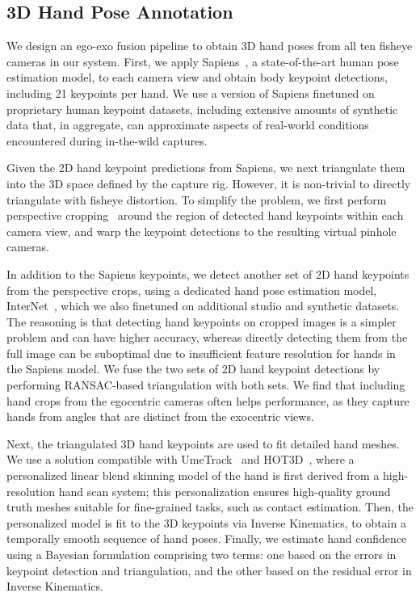 \documentclass[10pt,twocolumn,letterpaper]{article}
\begin{document}
\subsection{3D Hand Pose Annotation}
\label{sec:hand_pose}
We design an ego-exo fusion pipeline to obtain 3D hand poses from all ten  fisheye cameras in our system.
First, we apply Sapiens~\cite{khirodkar2024sapiens}, a state-of-the-art human pose  estimation model, to each camera view and obtain body keypoint detections, including 21 keypoints per hand. 
We use a version of Sapiens finetuned on proprietary human keypoint datasets, including extensive amounts of synthetic data that, in aggregate, can approximate aspects of real-world conditions encountered during in-the-wild captures.

Given the 2D hand keypoint predictions from Sapiens, we next triangulate them into the 3D space defined by the capture rig.
However, it is non-trivial to directly triangulate with fisheye distortion.
To simplify the problem, we first perform perspective cropping~\cite{han2022umetrack} around the region of detected hand keypoints within each camera view, and warp the keypoint detections to the resulting virtual pinhole cameras.


In addition to the Sapiens keypoints, we detect another set of 2D hand keypoints from the perspective crops, using a dedicated hand pose estimation model, InterNet~\cite{Moon_2020_ECCV_InterHand2.6M}, which we also finetuned on additional studio and synthetic datasets.
The reasoning is that detecting hand keypoints on cropped images is a simpler problem and can have higher accuracy, whereas directly detecting them from the full image can be suboptimal due to insufficient feature resolution for hands in the Sapiens model.
We fuse the two sets of 2D hand keypoint detections by performing RANSAC-based triangulation with both sets.
We find that including hand crops from the egocentric cameras often helps performance, as they capture hands from angles that are distinct from the exocentric views.


Next, the triangulated 3D hand keypoints are used to fit detailed hand meshes. 
We use a solution compatible with UmeTrack~\cite{han2022umetrack} and HOT3D~\cite{banerjee2025hot3d}, where a personalized linear blend skinning model of the hand is first derived from a high-resolution hand scan system;
this personalization ensures high-quality ground truth meshes suitable for fine-grained tasks, such as contact estimation.
Then, the personalized model is fit to the 3D keypoints via Inverse Kinematics, to obtain a temporally smooth sequence of hand poses.
Finally, we estimate hand confidence using a Bayesian formulation comprising two terms: one based on the errors in keypoint detection and triangulation, and the other based on the residual error in Inverse Kinematics.
\end{document}
